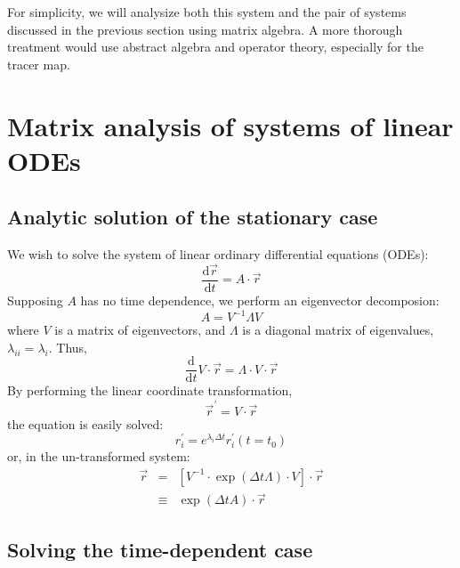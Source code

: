 \documentclass[12pt]{article}
\begin{document}
For simplicity, we will analysize both this system and the pair of systems
discussed in the previous section using matrix algebra.  A more thorough
treatment would use abstract algebra and operator theory, especially for
the tracer map.

\section{Matrix analysis of systems of linear ODEs} 

\subsection{Analytic solution of the stationary case}

We wish to solve the system of linear ordinary differential equations (ODEs):
\begin{equation}
\frac{\mathrm d \vec r}{\mathrm d t}=A \cdot \vec r
\label{linear_ODE_system_vector_soln}
\end{equation}
Supposing $A$ has no time dependence, we perform an eigenvector 
decomposion:
\begin{equation}
A = V^{-1} \Lambda V
\end{equation}
where $V$ is a matrix of eigenvectors, and $\Lambda$ is a diagonal matrix
of eigenvalues, $\lambda_{ii}=\lambda_i$.  Thus,
\begin{equation}
\frac{\mathrm d}{\mathrm d t} V \cdot \vec r=\Lambda \cdot V \cdot  \vec r
\end{equation}
By performing the linear coordinate transformation,
\begin{equation}
\vec r^\prime=V \cdot \vec r
\end{equation}
the equation is easily solved:
\begin{equation}
r^\prime_i = e^{\lambda_i \Delta t} r^\prime_i(t=t_0)
\end{equation}
or, in the un-transformed system:
\begin{eqnarray}
\vec r & = & \left [V^{-1} \cdot \exp(\Delta t \Lambda) \cdot V \right ] \cdot \vec r 
\label{solution_no_time_dependence} \\
& \equiv & \exp(\Delta t A)\cdot \vec r
\end{eqnarray}

\subsection{Solving the time-dependent case}
\end{document}
